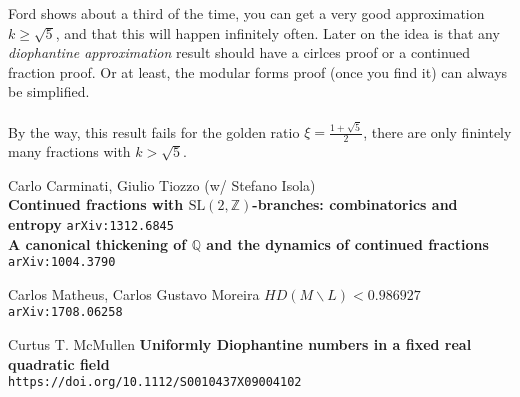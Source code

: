 \documentclass[12pt]{article}
\begin{document}
Ford shows about a third of the time, you can get a very good approximation $k \geq \sqrt{5}$, and that this will happen infinitely often.  Later on the idea is that any \textit{diophantine approximation} result should have a cirlces proof or a continued fraction proof.  Or at least, the modular forms proof (once you find it) can always be simplified. \\ \\
By the way, this result fails for the {\color{yellow!50!black} golden ratio} $\xi = \frac{1+\sqrt{5}}{2}$, there are only finintely many fractions with $k > \sqrt{5}$.

\vfill
\begin{thebibliography}{}

\item Carlo Carminati,  Giulio Tiozzo (w/ Stefano Isola)\\
\textbf{Continued fractions with $\text{SL}(2, \mathbb{Z})$-branches: combinatorics and entropy} \texttt{arXiv:1312.6845} \\
\textbf{A canonical thickening of $\mathbb{Q}$ and the dynamics of continued fractions}
\hspace{1em}\texttt{arXiv:1004.3790}
\item Carlos Matheus, Carlos Gustavo Moreira \textbf{$HD(M∖L)<0.986927$} \texttt{arXiv:1708.06258}
\item Curtus T. McMullen \textbf{Uniformly Diophantine numbers in a fixed real quadratic field} \\ \texttt{https://doi.org/10.1112/S0010437X09004102}

\end{thebibliography}
\end{document}
